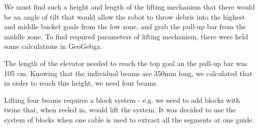 \begin{enumerate*}
  We must find such a height and length of the lifting mechanism that there would be an angle of tilt that would allow the robot to throw debris into the highest and middle bucket goals from the low zone, and grab the pull-up bar from the middle zone. To find required parameters of lifting mechanism, there were held some calculations in GeoGebga. %
  
  The length of the elevator needed to reach the top goal an the pull-up bar was 105 cm. Knowing that the individual beams are 350mm long, we calculated that in order to reach this height, we need four beams.  
  
  Lifting four beams requires a block system - e.g. we need to add blocks with twine that, when reeled in, would lift the system. It was decided to use the system of blocks when one cable is used to extract all the segments at one guide. %
  

\end{enumerate*}
